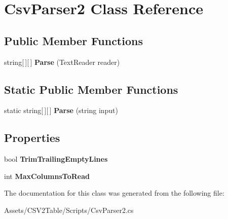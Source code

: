 \hypertarget{class_csv_parser2}{}\section{Csv\+Parser2 Class Reference}
\label{class_csv_parser2}
\subsection*{Public Member Functions}
\begin{DoxyCompactItemize}
\item 
string\mbox{[}$\,$\mbox{]}\mbox{[}$\,$\mbox{]} {\bfseries Parse} (Text\+Reader reader)\hypertarget{class_csv_parser2_aa3e63ec0fdb73c5a0e2f672eb2b5ffbb}{}\label{class_csv_parser2_aa3e63ec0fdb73c5a0e2f672eb2b5ffbb}

\end{DoxyCompactItemize}
\subsection*{Static Public Member Functions}
\begin{DoxyCompactItemize}
\item 
static string\mbox{[}$\,$\mbox{]}\mbox{[}$\,$\mbox{]} {\bfseries Parse} (string input)\hypertarget{class_csv_parser2_ae06b359f04d7930a475508a84e544f89}{}\label{class_csv_parser2_ae06b359f04d7930a475508a84e544f89}

\end{DoxyCompactItemize}
\subsection*{Properties}
\begin{DoxyCompactItemize}
\item 
bool {\bfseries Trim\+Trailing\+Empty\+Lines}\hypertarget{class_csv_parser2_a9fb0236e33d1b3c2a68b4df9d7ce8348}{}\label{class_csv_parser2_a9fb0236e33d1b3c2a68b4df9d7ce8348}

\item 
int {\bfseries Max\+Columns\+To\+Read}\hypertarget{class_csv_parser2_a61361f0095bce558b84f2e2096b3089c}{}\label{class_csv_parser2_a61361f0095bce558b84f2e2096b3089c}

\end{DoxyCompactItemize}


The documentation for this class was generated from the following file\+:\begin{DoxyCompactItemize}
\item 
Assets/\+C\+S\+V2\+Table/\+Scripts/Csv\+Parser2.\+cs\end{DoxyCompactItemize}
